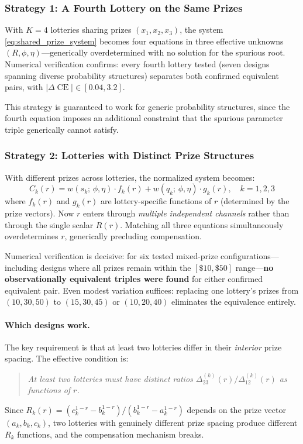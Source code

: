 \documentclass[11pt,a4paper]{article}
\theoremstyle{definition}
\DeclareMathOperator{\CE}{CE}
\begin{document}
\subsubsection{Strategy 1: A Fourth Lottery on the Same Prizes}

With $K = 4$ lotteries sharing prizes $(x_1, x_2, x_3)$, the system
\eqref{eq:shared_prize_system} becomes four equations in three effective
unknowns $(R, \phi, \eta)$---generically overdetermined with no solution for
the spurious root. Numerical verification confirms: every fourth lottery tested
(seven designs spanning diverse probability structures) separates both
confirmed equivalent pairs, with $|\Delta\CE| \in [0.04, 3.2]$.

This strategy is guaranteed to work for generic probability structures, since
the fourth equation imposes an additional constraint that the spurious
parameter triple generically cannot satisfy.

\subsubsection{Strategy 2: Lotteries with Distinct Prize Structures}

With different prizes across lotteries, the normalized system becomes:
\begin{equation}
    \label{eq:mixed_prize_system}
    C_k(r) = w(s_k;\, \phi, \eta) \cdot f_k(r)
    + w(q_k;\, \phi, \eta) \cdot g_k(r), \quad k = 1, 2, 3
\end{equation}
where $f_k(r)$ and $g_k(r)$ are lottery-specific functions of $r$ (determined
by the prize vectors). Now $r$ enters through \emph{multiple independent
channels} rather than through the single scalar $R(r)$. Matching all three
equations simultaneously overdetermines $r$, generically precluding
compensation.

Numerical verification is decisive: for six tested mixed-prize
configurations---including designs where all prizes remain within the
$[\$10, \$50]$ range---\textbf{no observationally equivalent triples were
found} for either confirmed equivalent pair. Even modest variation suffices:
replacing one lottery's prizes from $(10, 30, 50)$ to $(15, 30, 45)$ or
$(10, 20, 40)$ eliminates the equivalence entirely.

\paragraph{Which designs work.} The key requirement is that at least two
lotteries differ in their \emph{interior} prize spacing. The effective
condition is:
\begin{quote}
    \emph{At least two lotteries must have distinct ratios
    $\Delta_{23}^{(k)}(r) / \Delta_{12}^{(k)}(r)$ as functions of $r$.}
\end{quote}
Since $R_k(r) = (c_k^{1-r} - b_k^{1-r}) / (b_k^{1-r} - a_k^{1-r})$ depends
on the prize vector $(a_k, b_k, c_k)$, two lotteries with genuinely different
prize spacing produce different $R_k$ functions, and the compensation mechanism
breaks.
\end{document}
